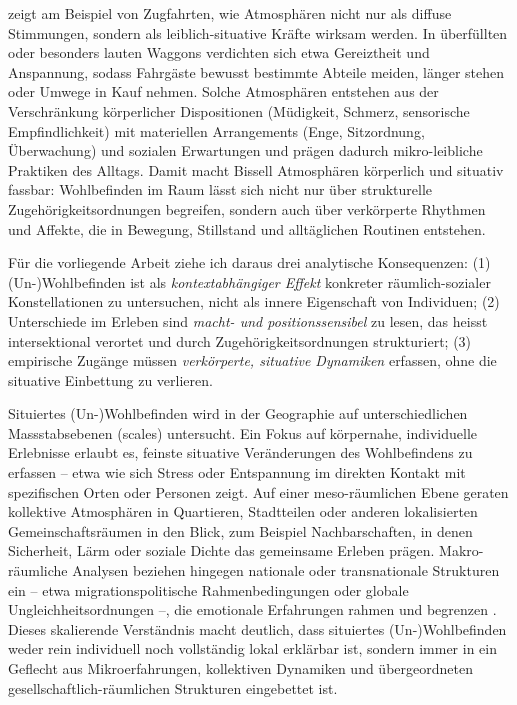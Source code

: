 \textcite{bissellPassengerMobilitiesAffective2010} zeigt am Beispiel von Zugfahrten, wie Atmosphären nicht nur als diffuse Stimmungen, sondern als leiblich-situative Kräfte wirksam werden. In überfüllten oder besonders lauten Waggons verdichten sich etwa Gereiztheit und Anspannung, sodass Fahrgäste bewusst bestimmte Abteile meiden, länger stehen oder Umwege in Kauf nehmen. Solche Atmosphären entstehen aus der Verschränkung körperlicher Dispositionen (Müdigkeit, Schmerz, sensorische Empfindlichkeit) mit materiellen Arrangements (Enge, Sitzordnung, Überwachung) und sozialen Erwartungen und prägen dadurch mikro-leibliche Praktiken des Alltags. Damit macht Bissell Atmosphären körperlich und situativ fassbar: Wohlbefinden im Raum lässt sich nicht nur über strukturelle Zugehörigkeitsordnungen begreifen, sondern auch über verkörperte Rhythmen und Affekte, die in Bewegung, Stillstand und alltäglichen Routinen entstehen.

Für die vorliegende Arbeit ziehe ich daraus drei analytische Konsequenzen: (1) (Un-)Wohlbefinden ist als \emph{kontextabhängiger Effekt} konkreter räumlich-sozialer Konstellationen zu untersuchen, nicht als innere Eigenschaft von Individuen; (2) Unterschiede im Erleben sind \emph{macht- und positionssensibel} zu lesen, das heisst intersektional verortet und durch Zugehörigkeitsordnungen strukturiert; (3) empirische Zugänge müssen \emph{verkörperte, situative Dynamiken} erfassen, ohne die situative Einbettung zu verlieren.

\vspace{1em}

Situiertes (Un-)Wohlbefinden wird in der Geographie auf unterschiedlichen Massstabsebenen (scales) untersucht. Ein Fokus auf körpernahe, individuelle Erlebnisse erlaubt es, feinste situative Veränderungen des Wohlbefindens zu erfassen -- etwa wie sich Stress oder Entspannung im direkten Kontakt mit spezifischen Orten oder Personen zeigt. Auf einer meso-räumlichen Ebene geraten kollektive Atmosphären in Quartieren, Stadtteilen oder anderen lokalisierten Gemeinschaftsräumen in den Blick, zum Beispiel Nachbarschaften, in denen Sicherheit, Lärm oder soziale Dichte das gemeinsame Erleben prägen. Makro-räumliche Analysen beziehen hingegen nationale oder transnationale Strukturen ein -- etwa migrationspolitische Rahmenbedingungen oder globale Ungleichheitsordnungen --, die emotionale Erfahrungen rahmen und begrenzen \parencite{howittScaleRelationMusical1998,marstonHumanGeographyScale2005}. Dieses skalierende Verständnis macht deutlich, dass situiertes (Un-)Wohlbefinden weder rein individuell noch vollständig lokal erklärbar ist, sondern immer in ein Geflecht aus Mikroerfahrungen, kollektiven Dynamiken und übergeordneten gesellschaftlich-räumlichen Strukturen eingebettet ist.

